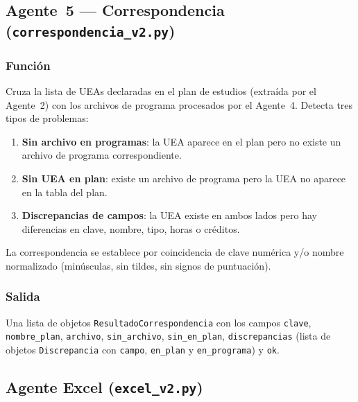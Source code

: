 \documentclass[11pt,a4paper]{article}
\begin{document}
\subsection{Agente~5 --- Correspondencia (\texttt{correspondencia\_v2.py})}

\subsubsection{Función}

Cruza la lista de UEAs declaradas en el plan de estudios (extraída por el Agente~2)
con los archivos de programa procesados por el Agente~4.
Detecta tres tipos de problemas:

\begin{enumerate}[nosep]
  \item \textbf{Sin archivo en programas}: la UEA aparece en el plan pero no existe
        un archivo de programa correspondiente.
  \item \textbf{Sin UEA en plan}: existe un archivo de programa pero la UEA no
        aparece en la tabla del plan.
  \item \textbf{Discrepancias de campos}: la UEA existe en ambos lados pero hay
        diferencias en clave, nombre, tipo, horas o créditos.
\end{enumerate}

La correspondencia se establece por coincidencia de clave numérica y/o nombre
normalizado (minúsculas, sin tildes, sin signos de puntuación).

\subsubsection{Salida}

Una lista de objetos \texttt{ResultadoCorrespondencia} con los campos \texttt{clave},
\texttt{nombre\_plan}, \texttt{archivo}, \texttt{sin\_archivo}, \texttt{sin\_en\_plan},
\texttt{discrepancias} (lista de objetos \texttt{Discrepancia} con \texttt{campo},
\texttt{en\_plan} y \texttt{en\_programa}) y \texttt{ok}.

\subsection{Agente Excel (\texttt{excel\_v2.py})}
\end{document}

